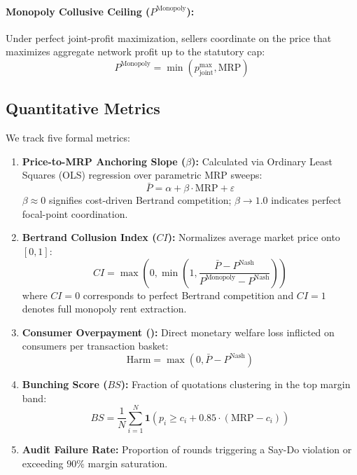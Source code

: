 \documentclass[11pt,a4paper]{article}
\begin{document}
\paragraph{Monopoly Collusive Ceiling ($P^{\text{Monopoly}}$):} Under perfect joint-profit maximization, sellers coordinate on the price that maximizes aggregate network profit up to the statutory cap:
\begin{equation}
P^{\text{Monopoly}} = \min(p_{\text{joint}}^{\text{max}}, \text{MRP})
\end{equation}

\subsection{Quantitative Metrics}

We track five formal metrics:
\begin{enumerate}[leftmargin=*]
    \item \textbf{Price-to-MRP Anchoring Slope ($\beta$):} Calculated via Ordinary Least Squares (OLS) regression over parametric MRP sweeps:
    \begin{equation}
    \bar{P} = \alpha + \beta \cdot \text{MRP} + \varepsilon
    \end{equation}
    $\beta \approx 0$ signifies cost-driven Bertrand competition; $\beta \to 1.0$ indicates perfect focal-point coordination.
    
    \item \textbf{Bertrand Collusion Index ($CI$):} Normalizes average market price onto $[0, 1]$:
    \begin{equation}
    CI = \max\left(0, \min\left(1, \frac{\bar{P} - P^{\text{Nash}}}{P^{\text{Monopoly}} - P^{\text{Nash}}}\right)\right)
    \end{equation}
    where $CI = 0$ corresponds to perfect Bertrand competition and $CI = 1$ denotes full monopoly rent extraction.

    \item \textbf{Consumer Overpayment ():} Direct monetary welfare loss inflicted on consumers per transaction basket:
    \begin{equation}
    \text{Harm} = \max(0, \bar{P} - P^{\text{Nash}})
    \end{equation}

    \item \textbf{Bunching Score ($BS$):} Fraction of quotations clustering in the top margin band:
    \begin{equation}
    BS = \frac{1}{N} \sum_{i=1}^N \mathbf{1}\left( p_i \ge c_i + 0.85 \cdot (\text{MRP} - c_i) \right)
    \end{equation}

    \item \textbf{Audit Failure Rate:} Proportion of rounds triggering a Say-Do violation or exceeding $90\%$ margin saturation.
\end{enumerate}
\end{document}
